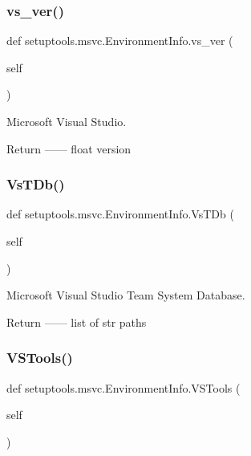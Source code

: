 \subsubsection{\texorpdfstring{vs\+\_\+ver()}{vs\_ver()}}
{\footnotesize\ttfamily def setuptools.\+msvc.\+Environment\+Info.\+vs\+\_\+ver (\begin{DoxyParamCaption}\item[{}]{self }\end{DoxyParamCaption})}

\begin{DoxyVerb}Microsoft Visual Studio.

Return
------
float
    version
\end{DoxyVerb}
 \mbox{\label{classsetuptools_1_1msvc_1_1EnvironmentInfo_a028eec8868bc5260636919e7765abe0b}} 
\subsubsection{\texorpdfstring{Vs\+T\+Db()}{VsTDb()}}
{\footnotesize\ttfamily def setuptools.\+msvc.\+Environment\+Info.\+Vs\+T\+Db (\begin{DoxyParamCaption}\item[{}]{self }\end{DoxyParamCaption})}

\begin{DoxyVerb}Microsoft Visual Studio Team System Database.

Return
------
list of str
    paths
\end{DoxyVerb}
 \mbox{\label{classsetuptools_1_1msvc_1_1EnvironmentInfo_a942785692dbd53f81650af2a9c18e0ff}} 
\subsubsection{\texorpdfstring{V\+S\+Tools()}{VSTools()}}
{\footnotesize\ttfamily def setuptools.\+msvc.\+Environment\+Info.\+V\+S\+Tools (\begin{DoxyParamCaption}\item[{}]{self }\end{DoxyParamCaption})}

